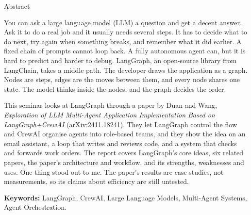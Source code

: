 \documentclass[12pt,a4paper]{report}
\begin{document}
\newpage
\thispagestyle{plain}
\begin{center}
    {\Large Abstract}
\end{center}
\vspace{0.6cm}
\begin{onehalfspace}
You can ask a large language model (LLM) a question and get a decent answer. Ask it to do a real job and it usually needs several steps. It has to decide what to do next, try again when something breaks, and remember what it did earlier. A fixed chain of prompts cannot loop back. A fully autonomous agent can, but it is hard to predict and harder to debug. LangGraph, an open-source library from LangChain, takes a middle path. The developer draws the application as a graph. Nodes are steps, edges are the moves between them, and every node shares one state. The model thinks inside the nodes, and the graph decides the order.

This seminar looks at LangGraph through a paper by Duan and Wang, \emph{Exploration of LLM Multi-Agent Application Implementation Based on LangGraph+CrewAI} (arXiv:2411.18241). They let LangGraph control the flow and CrewAI organise agents into role-based teams, and they show the idea on an email assistant, a loop that writes and reviews code, and a system that checks and forwards work orders. The report covers LangGraph's core ideas, six related papers, the paper's architecture and workflow, and its strengths, weaknesses and uses. One thing stood out to me. The paper's results are case studies, not measurements, so its claims about efficiency are still untested.
\end{onehalfspace}

\vspace{0.5cm}
\noindent\textbf{Keywords:} LangGraph, CrewAI, Large Language Models, Multi-Agent Systems, Agent Orchestration.

\newpage
{}
\setcounter{page}{1}
\tableofcontents
\newpage
\listoffigures
{}
\newpage
\listoftables
{}

\newpage
\end{document}
